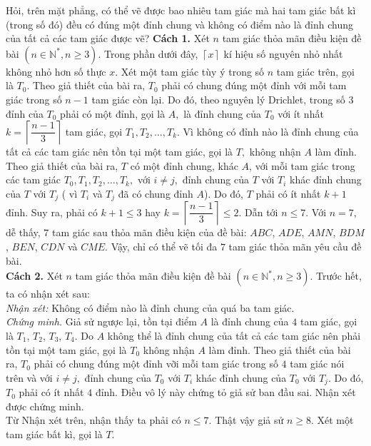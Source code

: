 \begin{bt}%
	Hỏi, trên mặt phẳng, có thể vẽ được bao nhiêu tam giác mà hai tam giác bất kì (trong số đó) đều có đúng một đỉnh chung và không có điểm nào là đỉnh chung của tất cả các tam giác được vẽ?
	\loigiai
	{
		\textbf{Cách 1.} 
		Xét $n$ tam giác thỏa mãn điều kiện đề bài $(n\in \mathbb{N}^*, n\geq 3).$
		Trong phần dưới đây, $\left \lceil{x}\right \rceil $ kí hiệu số nguyên nhỏ nhất không nhỏ hơn số thực $x.$
		Xét một tam giác tùy ý trong số $n$ tam giác trên, gọi là $T_0.$
		Theo giả thiết của bài ra, $T_0$ phải có chung đúng một đỉnh với mỗi tam giác trong số $n-1$ tam giác còn lại. Do đó, theo nguyên lý Drichlet, trong số $3$ đỉnh của $T_0$ phải có một đỉnh, gọi là $A,$ là đỉnh chung của $T_0$ với ít nhất $k=\left \lceil{\dfrac{n-1}{3}}\right \rceil$ tam giác, gọi $T_1, T_2, \ldots, T_k.$
		Vì không có đỉnh nào là đỉnh chung của tất cả các tam giác nên tồn tại một tam giác, gọi là $T,$ không nhận $A$ làm đỉnh. Theo giả thiết của bài ra, $T$ có một đỉnh chung, khác $A$, với mỗi tam giác trong các tam giác $T_0, T_1, T_2,\ldots, T_k,$ với $i\neq j,$ đỉnh chung của $T$ với $T_i$ khác đỉnh chung của $T$ với $T_j$ ( vì $T_i$ và $T_j$ đã có chung đỉnh $A$). Do đó, $T$ phải có ít nhất $k+1$ đỉnh. Suy ra, phải có $k+1\leq 3$ hay $k=\left \lceil{\dfrac{n-1}{3}}\right \rceil \leq 2.$ Dẫn tới $n\leq 7.$
		Với $n=7,$ dễ thấy, $7$ tam giác sau thỏa mãn điều kiện của đề bài: $ABC$, $ADE$, $AMN$, $BDM$, $BEN$, $CDN$ và $CME.$
		Vậy, chỉ có thể vẽ tối đa $7$ tam giác thỏa mãn yêu cầu đề bài.\\
		\textbf{Cách 2.}
		Xét $n$ tam giác thỏa mãn điều kiện đề bài $(n\in\mathbb{N}^*, n\geq 3).$
		Trước hết, ta có nhận xét sau:\\
		\textit{Nhận xét:} Không có điểm nào là đỉnh chung của quá ba tam giác.\\
		\textit{Chứng minh.} Giả sử ngược lại, tồn tại điểm $A$ là đỉnh chung của $4$ tam giác, gọi là $T_1$, $T_2$, $T_3$, $T_4.$
		Do $A$ không thể là đỉnh chung của tất cả các tam giác nên phải tồn tại một tam giác, gọi là $T_0$ không nhận $A$ làm đỉnh. 
		Theo giả thiết của bài ra, $T_0$ phải có chung đúng một đỉnh vỡi mỗi tam giác trong số $4$ tam giác nói trên và với $i\neq j,$ đỉnh chung của $T_0$ với $T_i$ khác đỉnh chung của $T_0$ với $T_j$. Do đó, $T_0$ phải có ít nhất $4$ đỉnh. Điều vô lý này chứng tỏ giả sử ban đầu sai.
		Nhận xét được chứng minh.\\
		Từ Nhận xét trên, nhận thấy ta phải có $n\leq 7$. Thật vậy giả sử $n\geq 8$. Xét một tam giác bất kì, gọi là $T.$
}
\end{bt}
